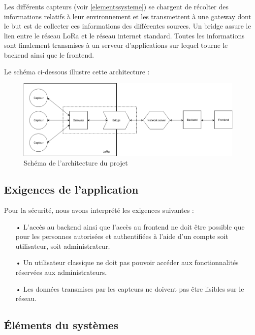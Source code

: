\documentclass[12pt]{article}
\begin{document}
Les différents capteurs (voir \autoref{elementssysteme}) se chargent de récolter des informations relatifs à leur environnement et les transmettent à une gateway dont le but est de collecter ces informations des différentes sources. Un bridge assure le lien entre le réseau LoRa et le réseau internet standard. Toutes les informations sont finalement transmises à un serveur d'applications sur lequel tourne le backend ainsi que le frontend.

Le schéma ci-dessous illustre cette architecture :

\begin{figure}[h!]
\includegraphics[width=\textwidth]{architecture}
\caption{Schéma de l'architecture du projet}
\end{figure}

\subsection{Exigences de l'application} %

Pour la sécurité, nous avons interprété les exigences suivantes :

\begin{itemize}
\item[•] L'accès au backend ainsi que l'accès au frontend ne doit être possible que pour les personnes autorisées et authentifiées à l'aide d'un compte soit utilisateur, soit administrateur.
\item[•] Un utilisateur classique ne doit pas pouvoir accéder aux fonctionnalités réservées aux administrateurs.
\item[•] Les données transmises par les capteurs ne doivent pas être lisibles sur le réseau.
\end{itemize}

\newpage
\subsection{Éléments du systèmes}\label{elementssysteme} %
\end{document}
